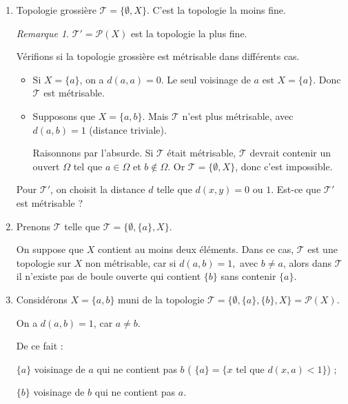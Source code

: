 \documentclass[french]{book}
\theoremstyle{definition}
\theoremstyle{remark}
\newtheorem*{remark}{Remarque}
\newcommand{\lesss}{<}
\newcommand{\less}{\lesss}
\begin{document}
\begin{enumerate}
  \item Topologie grossière $\mathscr{T}= \{ \emptyset, X \} $. C'est la topologie la moins fine.

  \begin{remark}
    $\mathscr{T}' = \mathscr{P}(X)  $ est la topologie la plus fine.
  \end{remark}

  Vérifions si la topologie grossière est métrisable dans différents cas.
  \begin{itemize}
    \item Si $X = \{ a \} $, on a $d(a,a) =0$. Le seul voisinage de $a$ est $X = \{ a \} $. Donc $\mathscr{T} $ est métrisable.
    \item Supposons que $X = \{ a,b \} $. Mais $\mathscr{T} $ n'est plus métrisable, avec $d(a,b) =1$ (distance triviale).

    Raisonnons par l'absurde. Si $\mathscr{T} $ était métrisable, $\mathscr{T} $ devrait contenir un ouvert $\Omega$ tel que $a \in \Omega$ et $b \notin \Omega$. Or $\mathscr{T} = \{ \emptyset, X \} $, donc c'est impossible.
  \end{itemize}

  Pour $\mathscr{T}' $, on choisit la distance $d$ telle que $d(x,y) = 0 \text{ ou } 1$. Est-ce que $\mathscr{T}' $ est métrisable ?

  \item Prenons $\mathscr{T} $ telle que $\mathscr{T} = \{ \emptyset, \{ a \} , X \} $.

  On suppose que $X$ contient au moins deux éléments. Dans ce cas, $\mathscr{T} $ est une topologie sur $X$ non métrisable, car si $d(a,b)=1,$ avec $ b \neq a$, alors dans $\mathscr{T} $ il n'existe pas de boule ouverte qui contient $\{ b \} $ sans contenir $\{ a \} $.

  \item Considérons $X = \{ a,b \}$ muni de la topologie $  \mathscr{T} = \{ \emptyset, \{ a \}, \{ b \}, X \} = \mathscr{P}(X)  $.

  On a $d(a,b) = 1$, car $a \neq b$.

  De ce fait :

  $\{ a \} $ voisinage de $a$ qui ne contient pas $b$ ( $\{ a \} = \{ x \text{ tel que } d(x,a) \less 1 \} $) ;

  $\{ b \} $ voisinage de $b$ qui ne contient pas $a$.




\end{enumerate}
\end{document}
